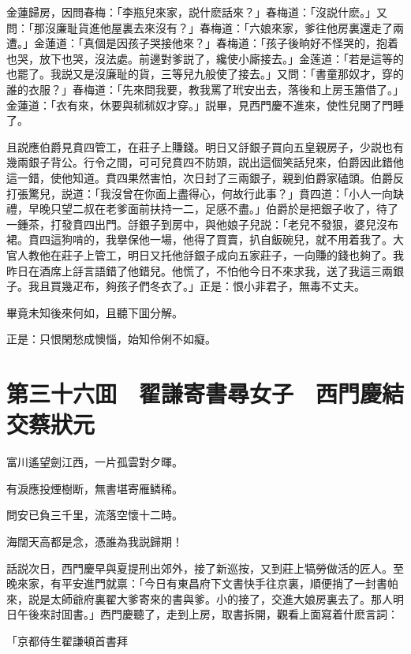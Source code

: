 金蓮歸房，因問春梅：「李瓶兒來家，説什麽話來？」春梅道：「沒説什麽。」又問：「那沒廉耻貨進他屋裏去來沒有？」春梅道：「六娘來家，爹往他房裏還走了兩遭。」金蓮道：「真個是因孩子哭接他來？」春梅道：「孩子後晌好不怪哭的，抱着也哭，放下也哭，沒法處。前邊對爹説了，纔使小廝接去。」金莲道：「若是這等的也罷了。我説又是沒廉耻的貨，三等兒九般使了接去。」又問：「書童那奴才，穿的誰的衣服？」春梅道：「先來問我要，教我罵了玳安出去，落後和上房玉簫借了。」金蓮道：「衣有來，休要與秫秫奴才穿。」説畢，見西門慶不進來，使性兒関了門睡了。

且説應伯爵見賁四管工，在莊子上賺錢。明日又㧱銀子買向五皇親房子，少説也有幾兩銀子背公。行令之間，可可兒賁四不防頭，説出這個笑話兒來，伯爵因此錯他這一錯，使他知道。賁四果然害怕，次日封了三兩銀子，親到伯爵家磕頭。伯爵反打張驚兒，説道：「我沒曾在你面上盡得心，何故行此事？」賁四道：「小人一向缺禮，早晚只望二叔在老爹面前扶持一二，足感不盡。」伯爵於是把銀子收了，待了一鍾茶，打發賁四出門。㧱銀子到房中，與他娘子兒説：「老兒不發狠，婆兒沒布裙。賁四這狗啃的，我擧保他一場，他得了買賣，扒自飯碗兒，就不用着我了。大官人教他在莊子上管工，明日又托他㧱銀子成向五家莊子，一向賺的錢也夠了。我昨日在酒席上㧱言語錯了他錯兒。他慌了，不怕他今日不來求我，送了我這三兩銀子。我且買幾疋布，夠孩子們冬衣了。」正是：恨小非君子，無毒不丈夫。

畢竟未知後來何如，且聽下囬分解。

正是：只恨閑愁成懊惱，始知伶俐不如癡。

\chapter*{第三十六囬　翟謙寄書尋女子　西門慶結交蔡狀元}

富川遙望劍江西，一片孤雲對夕暉。

有淚應投煙樹断，無書堪寄雁鳞稀。

問安已負三千里，流落空懷十二時。

海闊天高都是念，憑誰為我説歸期！

話説次日，西門慶早與夏提刑出郊外，接了新巡按，又到莊上犒勞做活的匠人。至晚來家，有平安進門就禀：「今日有東昌府下文書快手往京裏，順便捎了一封書帕來，説是太師爺府裏翟大爹寄來的書與爹。小的接了，交進大娘房裏去了。那人明日午後來討囬書。」西門慶聽了，走到上房，取書拆開，觀看上面寫着什麽言詞：

「京都侍生翟謙頓首書拜

